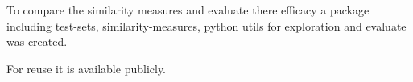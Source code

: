 
To compare the similarity measures and evaluate there efficacy a package including test-sets,
similarity-measures, python utils for exploration and evaluate was created.

For reuse it is available publicly\cite{ethereum-contract-similarity}.

